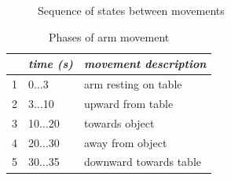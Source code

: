 \begin{figure}
\begin{minipage}{0.45\textwidth}
\caption{Sequence of states between movements}
\label{fig:prior_movement_phases}
\end{minipage}
\end{figure}

\begin{table}
\centering
\begin{tabular}{|c|l|l|}
\hline
 & \emph{time (s)} & \emph{movement description} \\
\hline
1 & 0$\dots$3 & arm resting on table \\
\hline
2 & 3$\dots$10 & upward from table \\
\hline
3 & 10$\dots$20 & towards object \\
\hline
4 & 20$\dots$30 & away from object \\
\hline
5 & 30$\dots$35 & downward towards table \\
\hline
\end{tabular}
\caption{Phases of arm movement}
\label{tab:prior_movement_phases}
\end{table}

